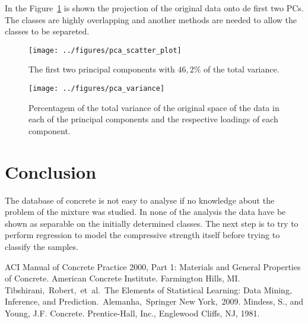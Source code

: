 \documentclass[conference]{IEEEtran}
\begin{document}
In the Figure~\ref{pca_scatter_plot} is shown the projection of the original data onto de first two PCs. The classes are highly overlapping and another methods are needed to allow the classes to be separeted.

\begin{figure}[htbp]
\centerline{\texttt{[image: ../figures/pca\_scatter\_plot]}}
\caption{The first two principal components with $46,2\%$ of the total variance.}
\label{pca_scatter_plot}
\end{figure}

\begin{figure}[htbp]
\centerline{\texttt{[image: ../figures/pca\_variance]}}
\caption{Percentagem of the total variance of the original space of the data in each of the principal components and the respective loadings of each component.}
\label{pca_variance}
\end{figure}

\section{Conclusion}\label{conclusions}

The database of concrete is not easy to analyse if no knowledge about the problem of the mixture was studied. In none of the analysis the data have be shown as separable on the initially determined classes. The next step is to try to perform regression to model the compressive strength itself before trying to classify the samples.

\begin{thebibliography}{00}
 ACI Manual of Concrete Practice 2000, Part 1: Materials and General Properties of Concrete.  American Concrete Institute.  Farmington Hills, MI.
 Tibshirani, Robert, et al. The Elements of  Statistical Learning:  Data Mining, Inference, and Prediction. Alemanha, Springer New York, 2009.
 Mindess, S., and Young, J.F. Concrete. Prentice-Hall, Inc., Englewood Cliffs, NJ, 1981.
\end{thebibliography}
\end{document}
